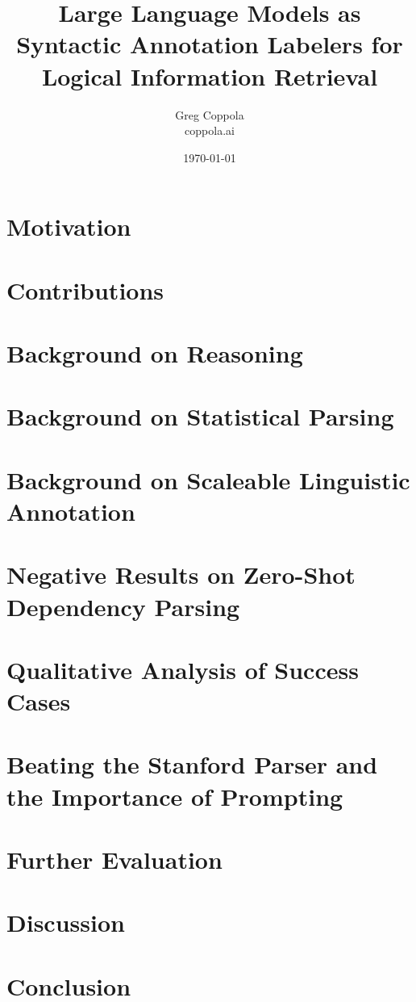 \documentclass[11pt]{article}
\title{Large Language Models as Syntactic Annotation Labelers for Logical Information Retrieval}
\author{Greg Coppola\\coppola.ai}
\date{\today}
\begin{document}
\maketitle



\section{Motivation}


\section{Contributions}


\section{Background on Reasoning}


\section{Background on Statistical Parsing}


\section{Background on Scaleable Linguistic Annotation}


\section{Negative Results on Zero-Shot Dependency Parsing}


\section{Qualitative Analysis of Success Cases}


\section{Beating the Stanford Parser and the Importance of Prompting}



\section{Further Evaluation}


\section{Discussion}


\section{Conclusion}




\end{document}
